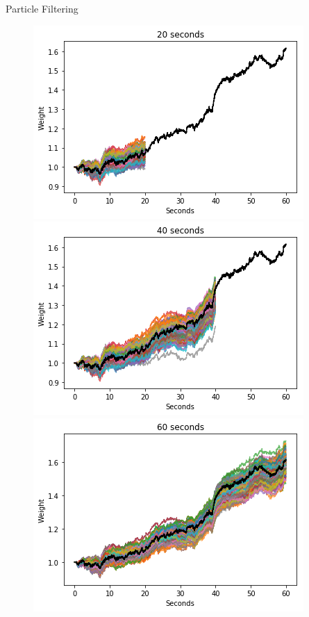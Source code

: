 \documentclass[aspectratio=169]{beamer}
\begin{document}
	\begin{frame}{Particle Filtering}
	    \begin{figure}
	        \centering
	        \includegraphics[scale=0.4]{true_20.png}
	        \includegraphics[scale=0.4]{true_40.png}\\
	        \includegraphics[scale=0.4]{true_60.png}
	    \end{figure}
	\end{frame}
	
\end{document}

